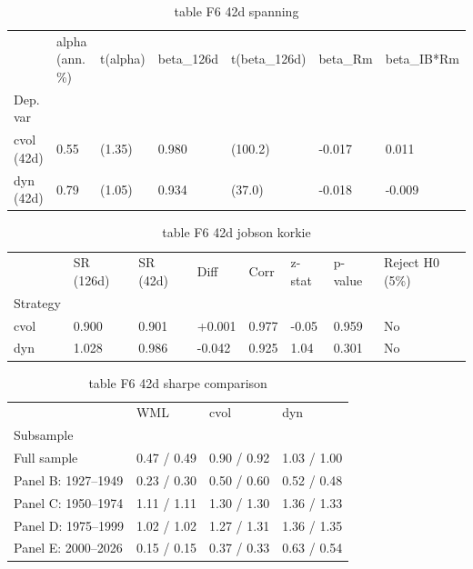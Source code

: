 \documentclass{article}
\begin{document}
\begin{table}[htbp]
  \centering
  \caption{table F6 42d spanning}
  \label{tab:table_F6_42d_spanning}
  \begin{tabular}{lllllll}
\toprule
 & alpha (ann. \%) & t(alpha) & beta\_126d & t(beta\_126d) & beta\_Rm & beta\_IB*Rm \\
Dep. var &  &  &  &  &  &  \\
\midrule
cvol (42d) & 0.55 & (1.35) & 0.980 & (100.2) & -0.017 & 0.011 \\
dyn (42d) & 0.79 & (1.05) & 0.934 & (37.0) & -0.018 & -0.009 \\
\bottomrule
\end{tabular}
\end{table}

\begin{table}[htbp]
  \centering
  \caption{table F6 42d jobson korkie}
  \label{tab:table_F6_42d_jobson_korkie}
  \begin{tabular}{llllllll}
\toprule
 & SR (126d) & SR (42d) & Diff & Corr & z-stat & p-value & Reject H0 (5\%) \\
Strategy &  &  &  &  &  &  &  \\
\midrule
cvol & 0.900 & 0.901 & +0.001 & 0.977 & -0.05 & 0.959 & No \\
dyn & 1.028 & 0.986 & -0.042 & 0.925 & 1.04 & 0.301 & No \\
\bottomrule
\end{tabular}
\end{table}

\begin{table}[htbp]
  \centering
  \caption{table F6 42d sharpe comparison}
  \label{tab:table_F6_42d_sharpe_comparison}
  \begin{tabular}{llll}
\toprule
 & WML & cvol & dyn \\
Subsample &  &  &  \\
\midrule
Full sample & 0.47 / 0.49 & 0.90 / 0.92 & 1.03 / 1.00 \\
Panel B: 1927--1949 & 0.23 / 0.30 & 0.50 / 0.60 & 0.52 / 0.48 \\
Panel C: 1950--1974 & 1.11 / 1.11 & 1.30 / 1.30 & 1.36 / 1.33 \\
Panel D: 1975--1999 & 1.02 / 1.02 & 1.27 / 1.31 & 1.36 / 1.35 \\
Panel E: 2000--2026 & 0.15 / 0.15 & 0.37 / 0.33 & 0.63 / 0.54 \\
\bottomrule
\end{tabular}
\end{table}
\end{document}
